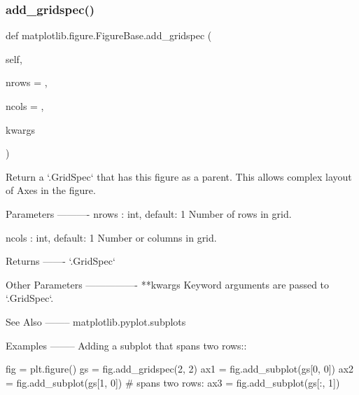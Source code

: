  \mbox{\label{classmatplotlib_1_1figure_1_1FigureBase_a431e550a98fe4a303733cce35e19364d}} 
\subsubsection{\texorpdfstring{add\+\_\+gridspec()}{add\_gridspec()}}
{\footnotesize\ttfamily def matplotlib.\+figure.\+Figure\+Base.\+add\+\_\+gridspec (\begin{DoxyParamCaption}\item[{}]{self,  }\item[{}]{nrows = {},  }\item[{}]{ncols = {},  }\item[{}]{kwargs }\end{DoxyParamCaption})}

\begin{DoxyVerb}Return a `.GridSpec` that has this figure as a parent.  This allows
complex layout of Axes in the figure.

Parameters
----------
nrows : int, default: 1
    Number of rows in grid.

ncols : int, default: 1
    Number or columns in grid.

Returns
-------
`.GridSpec`

Other Parameters
----------------
**kwargs
    Keyword arguments are passed to `.GridSpec`.

See Also
--------
matplotlib.pyplot.subplots

Examples
--------
Adding a subplot that spans two rows::

    fig = plt.figure()
    gs = fig.add_gridspec(2, 2)
    ax1 = fig.add_subplot(gs[0, 0])
    ax2 = fig.add_subplot(gs[1, 0])
    # spans two rows:
    ax3 = fig.add_subplot(gs[:, 1])\end{DoxyVerb}
 \mbox{\label{classmatplotlib_1_1figure_1_1FigureBase_aa6e0344bfbfade6f80cb88990bccd467}} 
